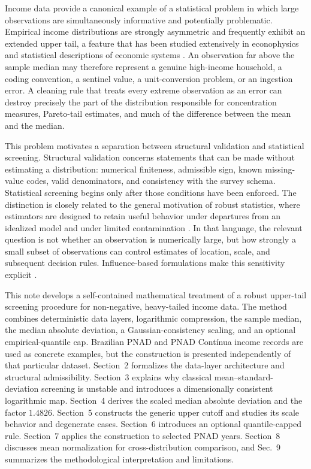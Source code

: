 \documentclass[12pt]{article}
\numberwithin{equation}{section}
\begin{document}
Income data provide a canonical example of a statistical problem in which large observations are simultaneously informative and potentially problematic. Empirical income distributions are strongly asymmetric and frequently exhibit an extended upper tail, a feature that has been studied extensively in econophysics and statistical descriptions of economic systems \cite{yakovenko2009}. An observation far above the sample median may therefore represent a genuine high-income household, a coding convention, a sentinel value, a unit-conversion problem, or an ingestion error. A cleaning rule that treats every extreme observation as an error can destroy precisely the part of the distribution responsible for concentration measures, Pareto-tail estimates, and much of the difference between the mean and the median.

This problem motivates a separation between structural validation and statistical screening. Structural validation concerns statements that can be made without estimating a distribution: numerical finiteness, admissible sign, known missing-value codes, valid denominators, and consistency with the survey schema. Statistical screening begins only after those conditions have been enforced. The distinction is closely related to the general motivation of robust statistics, where estimators are designed to retain useful behavior under departures from an idealized model and under limited contamination \cite{huber2009}. In that language, the relevant question is not whether an observation is numerically large, but how strongly a small subset of observations can control estimates of location, scale, and subsequent decision rules. Influence-based formulations make this sensitivity explicit \cite{hampel1974}.

This note develops a self-contained mathematical treatment of a robust upper-tail screening procedure for non-negative, heavy-tailed income data. The method combines deterministic data layers, logarithmic compression, the sample median, the median absolute deviation, a Gaussian-consistency scaling, and an optional empirical-quantile cap. Brazilian PNAD and PNAD Cont\'inua income records are used as concrete examples, but the construction is presented independently of that particular dataset. Section~2 formalizes the data-layer architecture and structural admissibility. Section~3 explains why classical mean--standard-deviation screening is unstable and introduces a dimensionally consistent logarithmic map. Section~4 derives the scaled median absolute deviation and the factor $1.4826$. Section~5 constructs the generic upper cutoff and studies its scale behavior and degenerate cases. Section~6 introduces an optional quantile-capped rule. Section~7 applies the construction to selected PNAD years. Section~8 discusses mean normalization for cross-distribution comparison, and Sec.~9 summarizes the methodological interpretation and limitations.
\end{document}

